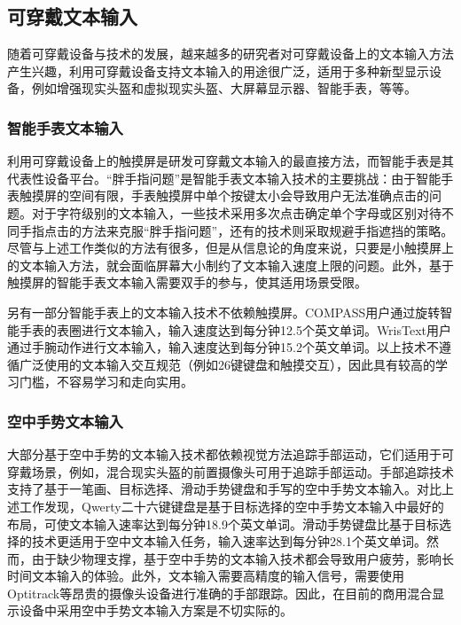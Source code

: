 \subsection{可穿戴文本输入}

随着可穿戴设备与技术的发展，越来越多的研究者对可穿戴设备上的文本输入方法产生兴趣，利用可穿戴设备支持文本输入的用途很广泛，适用于多种新型显示设备，例如增强现实头盔和虚拟现实头盔\cite{yu2017tap, yu2016one}、大屏幕显示器\cite{markussen2013selection, schick2012vision}、智能手表\cite{oney2013zoomboard, yi2017compass}，等等。

\subsubsection{智能手表文本输入}

利用可穿戴设备上的触摸屏是研发可穿戴文本输入的最直接方法，而智能手表是其代表性设备平台。“胖手指问题”是智能手表文本输入技术的主要挑战\cite{yi2017too}：由于智能手表触摸屏的空间有限，手表触摸屏中单个按键太小会导致用户无法准确点击的问题。对于字符级别的文本输入，一些技术采用多次点击确定单个字母\cite{chen2014swipeboard, hong2015splitboard, oney2013zoomboard}或区别对待不同手指点击\cite{gupta2016dualkey}的方法来克服“胖手指问题”，还有的技术则采取规避手指遮挡的策略\cite{leiva2015text, shibata2016driftboard}。尽管与上述工作类似的方法有很多，但是从信息论的角度来说，只要是小触摸屏上的文本输入方法，就会面临屏幕大小制约了文本输入速度上限的问题\cite{yi2017too}。此外，基于触摸屏的智能手表文本输入需要双手的参与，使其适用场景受限。

另有一部分智能手表上的文本输入技术不依赖触摸屏。COMPASS用户通过旋转智能手表的表圈进行文本输入\cite{yi2017compass}，输入速度达到每分钟12.5个英文单词。WrisText用户通过手腕动作进行文本输入\cite{gong2018wristext}，输入速度达到每分钟15.2个英文单词。以上技术不遵循广泛使用的文本输入交互规范（例如26键键盘和触摸交互），因此具有较高的学习门槛，不容易学习和走向实用。

\subsubsection{空中手势文本输入}

大部分基于空中手势的文本输入技术都依赖视觉方法追踪手部运动，它们适用于可穿戴场景，例如，混合现实头盔的前置摄像头可用于追踪手部运动。手部追踪技术支持了基于一笔画\cite{ni2011airstroke}、目标选择\cite{markussen2013selection}、滑动手势键盘\cite{kristensson2004shark2}和手写\cite{schick2012vision}的空中手势文本输入。对比上述工作发现，Qwerty二十六键键盘是基于目标选择的空中手势文本输入中最好的布局，可使文本输入速率达到每分钟18.9个英文单词\cite{markussen2013selection}。滑动手势键盘比基于目标选择的技术更适用于空中文本输入任务，输入速率达到每分钟28.1个英文单词\cite{markussen2014vulture}。然而，由于缺少物理支撑，基于空中手势的文本输入技术都会导致用户疲劳，影响长时间文本输入的体验。此外，文本输入需要高精度的输入信号，需要使用Optitrack\cite{point2011optitrack}等昂贵的摄像头设备进行准确的手部跟踪。因此，在目前的商用混合显示设备中采用空中手势文本输入方案是不切实际的。

